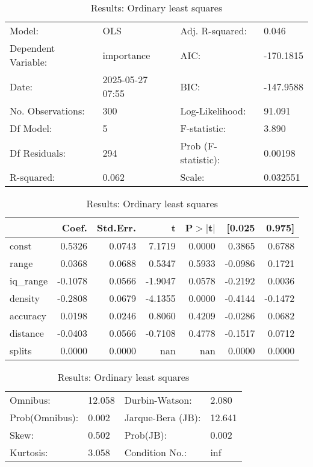 \begin{table}
\caption{Results: Ordinary least squares}
\label{}
\begin{center}
\begin{tabular}{llll}
\hline
Model:              & OLS              & Adj. R-squared:     & 0.046      \\
Dependent Variable: & importance       & AIC:                & -170.1815  \\
Date:               & 2025-05-27 07:55 & BIC:                & -147.9588  \\
No. Observations:   & 300              & Log-Likelihood:     & 91.091     \\
Df Model:           & 5                & F-statistic:        & 3.890      \\
Df Residuals:       & 294              & Prob (F-statistic): & 0.00198    \\
R-squared:          & 0.062            & Scale:              & 0.032551   \\
\hline
\end{tabular}
\end{center}

\begin{center}
\begin{tabular}{lrrrrrr}
\hline
          &   Coef. & Std.Err. &       t & P$> |$t$|$ &  [0.025 &  0.975]  \\
\hline
const     &  0.5326 &   0.0743 &  7.1719 &      0.0000 &  0.3865 &  0.6788  \\
range     &  0.0368 &   0.0688 &  0.5347 &      0.5933 & -0.0986 &  0.1721  \\
iq\_range & -0.1078 &   0.0566 & -1.9047 &      0.0578 & -0.2192 &  0.0036  \\
density   & -0.2808 &   0.0679 & -4.1355 &      0.0000 & -0.4144 & -0.1472  \\
accuracy  &  0.0198 &   0.0246 &  0.8060 &      0.4209 & -0.0286 &  0.0682  \\
distance  & -0.0403 &   0.0566 & -0.7108 &      0.4778 & -0.1517 &  0.0712  \\
splits    &  0.0000 &   0.0000 &     nan &         nan &  0.0000 &  0.0000  \\
\hline
\end{tabular}
\end{center}

\begin{center}
\begin{tabular}{llll}
\hline
Omnibus:       & 12.058 & Durbin-Watson:    & 2.080   \\
Prob(Omnibus): & 0.002  & Jarque-Bera (JB): & 12.641  \\
Skew:          & 0.502  & Prob(JB):         & 0.002   \\
Kurtosis:      & 3.058  & Condition No.:    & inf     \\
\hline
\end{tabular}
\end{center}
\end{table}
